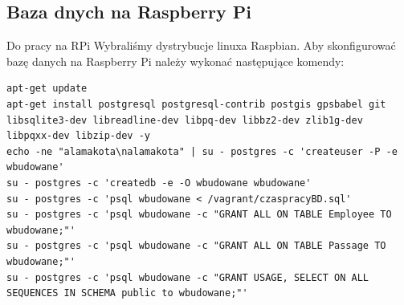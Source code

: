 \subsection{Baza dnych na Raspberry Pi}
Do pracy na RPi Wybraliśmy dystrybucje linuxa Raspbian.
Aby skonfigurować bazę danych na Raspberry Pi należy wykonać następujące komendy:
\lstset{language=bash, breaklines=true}
\begin{lstlisting}
apt-get update
apt-get install postgresql postgresql-contrib postgis gpsbabel git libsqlite3-dev libreadline-dev libpq-dev libbz2-dev zlib1g-dev libpqxx-dev libzip-dev -y
echo -ne "alamakota\nalamakota" | su - postgres -c 'createuser -P -e wbudowane'
su - postgres -c 'createdb -e -O wbudowane wbudowane'
su - postgres -c 'psql wbudowane < /vagrant/czaspracyBD.sql'
su - postgres -c 'psql wbudowane -c "GRANT ALL ON TABLE Employee TO wbudowane;"'
su - postgres -c 'psql wbudowane -c "GRANT ALL ON TABLE Passage TO wbudowane;"'
su - postgres -c 'psql wbudowane -c "GRANT USAGE, SELECT ON ALL SEQUENCES IN SCHEMA public to wbudowane;"'
\end{lstlisting}



